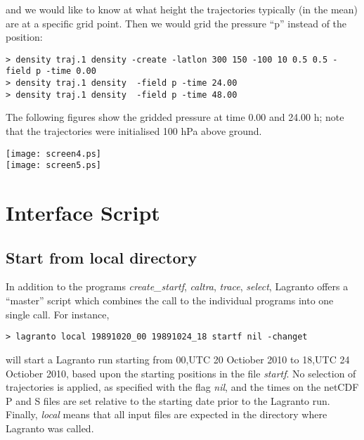 \documentclass[a4paper,10pt]{article}
\begin{document}
\noindent
and we would like to know at what height the trajectories typically (in the mean) are at a specific grid point. Then we would grid the pressure ``p'' instead of the position:

\begin{verbatim}
> density traj.1 density -create -latlon 300 150 -100 10 0.5 0.5 -field p -time 0.00
> density traj.1 density  -field p -time 24.00
> density traj.1 density  -field p -time 48.00
\end{verbatim}

\noindent
The following figures show the gridded pressure at time 0.00 and 24.00 h; note that the trajectories were initialised 100 hPa above ground.

\noindent
\begin{center}
\texttt{[image: screen4.ps]}
\\
\texttt{[image: screen5.ps]}
\end{center}

\section{Interface Script}

\subsection{Start from local directory}

In addition to the programs {\em create\_startf}, {\em caltra}, {\em trace}, {\em select}, Lagranto offers a ``master'' script which combines the call to the individual programs into one single call. For instance,
\begin{verbatim}
> lagranto local 19891020_00 19891024_18 startf nil -changet
\end{verbatim}
will start a Lagranto run starting from 00,UTC 20 Octiober 2010 to  18,UTC 24 Octiober 2010, based upon the starting positions in the file {\em startf}. No selection of trajectories is applied, as specified with the flag {\em nil}, and the times on the netCDF P and S files are set relative to the starting date prior  to the Lagranto run. Finally, {\em local} means that all input files are expected in the directory where Lagranto was called.\\
\end{document}
